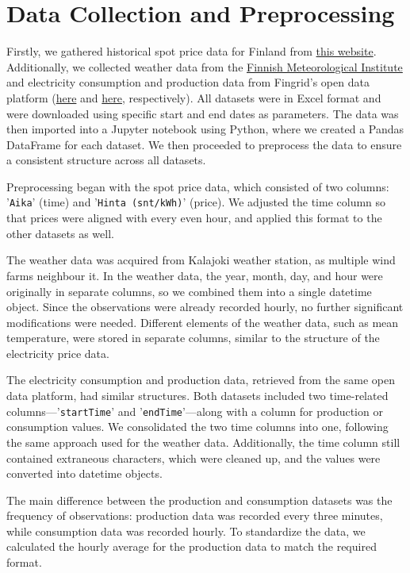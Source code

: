\documentclass{article}
\numberwithin{equation}{section}
\begin{document}
\section{Data Collection and Preprocessing}
Firstly, we gathered historical spot price data for Finland from \href{https://porssisahko.net/tilastot}{this website}. Additionally, we collected weather data from the \href{https://www.ilmatieteenlaitos.fi/avoin-data/}{Finnish Meteorological Institute} and electricity consumption and production data from Fingrid's open data platform (\href{https://data.fingrid.fi/en/datasets/124}{here} and \href{https://data.fingrid.fi/en/datasets/192}{here}, respectively). All datasets were in Excel format and were downloaded using specific start and end dates as parameters. The data was then imported into a Jupyter notebook using Python, where we created a Pandas DataFrame for each dataset. We then proceeded to preprocess the data to ensure a consistent structure across all datasets.

Preprocessing began with the spot price data, which consisted of two columns: '\verb|Aika|' (time) and '\verb|Hinta (snt/kWh)|' (price). We adjusted the time column so that prices were aligned with every even hour, and applied this format to the other datasets as well. 

The weather data was acquired from Kalajoki weather station, as multiple wind farms neighbour it. In the weather data, the year, month, day, and hour were originally in separate columns, so we combined them into a single datetime object. Since the observations were already recorded hourly, no further significant modifications were needed. Different elements of the weather data, such as mean temperature, were stored in separate columns, similar to the structure of the electricity price data.

The electricity consumption and production data, retrieved from the same open data platform, had similar structures. Both datasets included two time-related columns—'\verb|startTime|' and '\verb|endTime|'—along with a column for production or consumption values. We consolidated the two time columns into one, following the same approach used for the weather data. Additionally, the time column still contained extraneous characters, which were cleaned up, and the values were converted into datetime objects.

The main difference between the production and consumption datasets was the frequency of observations: production data was recorded every three minutes, while consumption data was recorded hourly. To standardize the data, we calculated the hourly average for the production data to match the required format.
\end{document}
